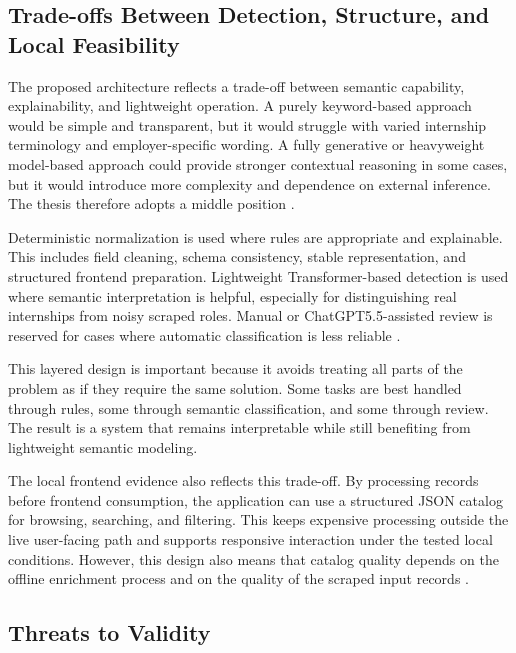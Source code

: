 \subsection{Trade-offs Between Detection, Structure, and Local Feasibility}

The proposed architecture reflects a trade-off between semantic capability, explainability, and
lightweight operation. A purely keyword-based approach would be simple and transparent,
but it would struggle with varied internship terminology and employer-specific wording. A
fully generative or heavyweight model-based approach could provide stronger contextual
reasoning in some cases, but it would introduce more complexity and dependence on external
inference. The thesis therefore adopts a middle position \cite{bass2012software, schwartz2020green, jain1991art}.

Deterministic normalization is used where rules are appropriate and explainable. This
includes field cleaning, schema consistency, stable representation, and structured frontend
preparation. Lightweight Transformer-based detection is used where semantic interpretation
is helpful, especially for distinguishing real internships from noisy scraped roles. Manual or
ChatGPT5.5-assisted review is reserved for cases where automatic classification is less
reliable \cite{sarawagi2008information, krippendorff2004content}.

This layered design is important because it avoids treating all parts of the problem as if they
require the same solution. Some tasks are best handled through rules, some through semantic
classification, and some through review. The result is a system that remains interpretable
while still benefiting from lightweight semantic modeling.

The local frontend evidence also reflects this trade-off. By processing records before frontend
consumption, the application can use a structured JSON catalog for browsing, searching, and
filtering. This keeps expensive processing outside the live user-facing path and supports
responsive interaction under the tested local conditions. However, this design also means that
catalog quality depends on the offline enrichment process and on the quality of the scraped
input records \cite{jain1991art, kleppmann2017designing}.

\subsection{Threats to Validity}

